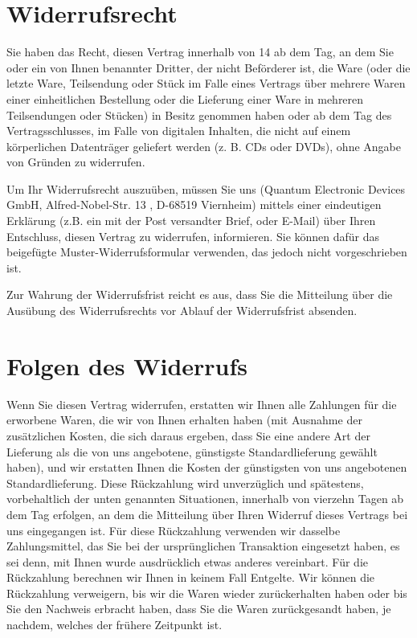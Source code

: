 \documentclass[%
    a4paper,%
    10pt,
]{scrartcl}
\begin{document}
\section*{Widerrufsrecht}
Sie haben das Recht, diesen Vertrag innerhalb von \qty{14}{\days} ab dem Tag, an dem Sie oder ein von Ihnen benannter Dritter, der nicht Beförderer ist, die Ware (oder die letzte Ware, Teilsendung oder Stück im Falle eines Vertrags über mehrere Waren einer einheitlichen Bestellung oder die Lieferung einer Ware in mehreren Teilsendungen oder Stücken) in Besitz genommen haben oder ab dem Tag des Vertragsschlusses, im Falle von digitalen Inhalten, die nicht auf einem körperlichen Datenträger geliefert werden (z. B. CDs oder DVDs), ohne Angabe von Gründen zu widerrufen.

Um Ihr Widerrufsrecht auszuüben, müssen Sie uns (Quantum Electronic Devices GmbH, Alfred-Nobel-Str. 13 , D-68519 Viernheim) mittels einer eindeutigen Erklärung (z.B. ein mit der Post versandter Brief, oder E-Mail) über Ihren Entschluss, diesen Vertrag zu widerrufen, informieren. Sie können dafür das beigefügte Muster-Widerrufsformular verwenden, das jedoch nicht vorgeschrieben ist.

Zur Wahrung der Widerrufsfrist reicht es aus, dass Sie die Mitteilung über die Ausübung des Widerrufsrechts vor Ablauf der Widerrufsfrist absenden.

\section*{Folgen des Widerrufs}
Wenn Sie diesen Vertrag widerrufen, erstatten wir Ihnen alle Zahlungen für die erworbene Waren, die wir von Ihnen erhalten haben  (mit Ausnahme der zusätzlichen Kosten, die sich daraus ergeben, dass Sie eine andere Art der Lieferung als die von uns angebotene, günstigste Standardlieferung gewählt haben), und wir erstatten Ihnen die Kosten der günstigsten von uns angebotenen Standardlieferung. Diese Rückzahlung wird unverzüglich und spätestens, vorbehaltlich der unten genannten Situationen, innerhalb von vierzehn Tagen ab dem Tag erfolgen, an dem die Mitteilung über Ihren Widerruf dieses Vertrags bei uns eingegangen ist. Für diese Rückzahlung verwenden wir dasselbe Zahlungsmittel, das Sie bei der ursprünglichen Transaktion eingesetzt haben, es sei denn, mit Ihnen wurde ausdrücklich etwas anderes vereinbart. Für die Rückzahlung berechnen wir Ihnen in keinem Fall Entgelte. Wir können die Rückzahlung verweigern, bis wir die Waren wieder zurückerhalten haben oder bis Sie den Nachweis erbracht haben, dass Sie die Waren zurückgesandt haben, je nachdem, welches der frühere Zeitpunkt ist.
\end{document}
